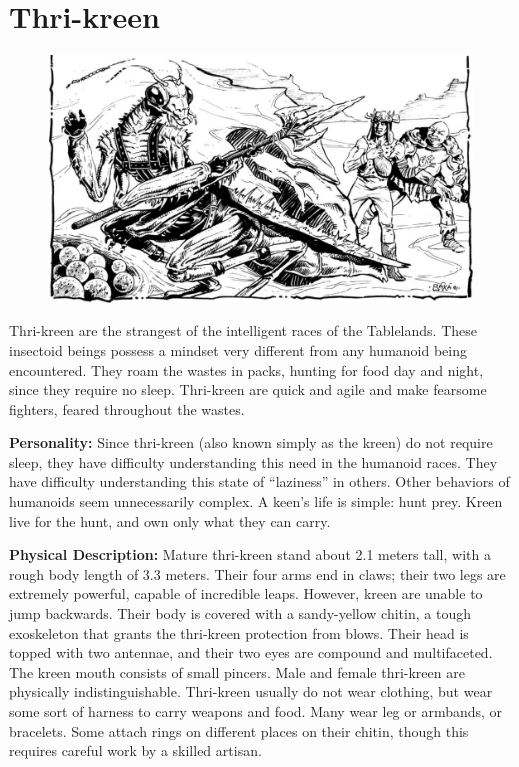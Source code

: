 \section{Thri-kreen}

\begin{figure}[t!]
\centering
\includegraphics[width=\textwidth]{images/thrikreen-1.png}
\WOTC
\end{figure}

Thri-kreen are the strangest of the intelligent races of the Tablelands. These insectoid beings possess a mindset very different from any humanoid being encountered. They roam the wastes in packs, hunting for food day and night, since they require no sleep. Thri-kreen are quick and agile and make fearsome fighters, feared throughout the wastes.

\textbf{Personality:} Since thri-kreen (also known simply as the kreen) do not require sleep, they have difficulty understanding this need in the humanoid races. They have difficulty understanding this state of ``laziness'' in others. Other behaviors of humanoids seem unnecessarily complex. A keen's life is simple: hunt prey. Kreen live for the hunt, and own only what they can carry.

\textbf{Physical Description:} Mature thri-kreen stand about 2.1 meters tall, with a rough body length of 3.3 meters. Their four arms end in claws; their two legs are extremely powerful, capable of incredible leaps. However, kreen are unable to jump backwards. Their body is covered with a sandy-yellow chitin, a tough exoskeleton that grants the thri-kreen protection from blows. Their head is topped with two antennae, and their two eyes are compound and multifaceted. The kreen mouth consists of small pincers. Male and female thri-kreen are physically indistinguishable. Thri-kreen usually do not wear clothing, but wear some sort of harness to carry weapons and food. Many wear leg or armbands, or bracelets. Some attach rings on different places on their chitin, though this requires careful work by a skilled artisan.

